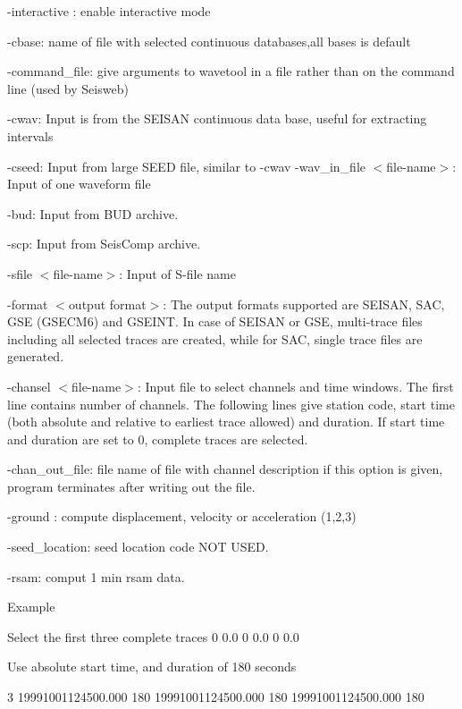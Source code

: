 -interactive : enable interactive mode 

-cbase: name of file with selected continuous databases,all bases  is default 

-command\_file: give arguments to wavetool in a file rather than on the command line (used by Seisweb) 

-cwav: Input is from the SEISAN continuous data base, useful for extracting intervals 

-cseed: Input from large SEED file, similar to -cwav -wav\_in\_file $<$file-name$>$: Input of one waveform file 

-bud: Input from BUD archive.

-scp: Input from SeisComp archive.

-sfile $<$file-name$>$: Input of S-file name 

-format $<$output format$>$: The output formats supported are SEISAN, SAC, GSE (GSECM6) and GSEINT. In case of SEISAN or GSE, multi-trace files including all selected traces are created, while for SAC, single trace files are generated. 

-chansel $<$file-name$>$: Input file to select channels and time windows. The first line contains number of channels. The following lines give station code, start time (both absolute and relative to earliest trace allowed) and duration. If start time and duration are set to 0, complete traces are selected. 

-chan\_out\_file: file name  of file with channel description if this option is given, program terminates after writing out the file.

-ground : compute displacement, velocity or acceleration (1,2,3)

-seed\_location: seed location code NOT USED.

-rsam: comput 1 min rsam data.

Example 

Select the first three complete traces  0 0.0  0 0.0  0 0.0 

Use absolute start time, and duration of 180 seconds 

3  19991001124500.000 180  19991001124500.000 180  19991001124500.000 180 

